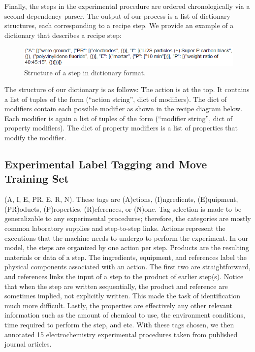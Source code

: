 Finally, the steps in the experimental procedure are ordered chronologically via a second dependency parser. The output of our process is a list of dictionary structures, each corresponding to a recipe step. We provide an example of a dictionary that describes a recipe step:

\begin{figure}
  \centering
    \includegraphics[width=.5\textwidth]{sampleout.png}
  \caption{Structure of a step in dictionary format.}
\end{figure}

The structure of our dictionary is as follows: The action is at the top. It contains a list of tuples of the form (“action string”, dict of modifiers). The dict of modifiers contain each possible modifier as shown in the recipe diagram below. Each modifier is again a list of tuples of the form (“modifier string”, dict of property modifiers). The dict of property modifiers is a list of properties that modify the modifier.

\subsection{Experimental Label Tagging and Move Training Set}
(A, I, E, PR, E, R, N). These tags are (A)ctions, (I)ngredients, (E)quipment, (PR)oducts, (P)roperties, (R)eferences, or (N)one. Tag selection is made to be generalizable to any experimental procedures; therefore, the categories are mostly common laboratory supplies and step-to-step links. Actions represent the executions that the machine needs to undergo to perform the experiment. In our model, the steps are organized by one action per step. Products are the resulting materials or data of a step. The ingredients, equipment, and references label the physical components associated with an action. The first two are straightforward, and references links the input of a step to the product of earlier step(s). Notice that when the step are written sequentially, the product and reference are sometimes implied, not explicitly written. This made the task of identification much more difficult. Lastly, the properties are effectively any other relevant information such as the amount of chemical to use, the environment conditions, time required to perform the step, and etc. With these tags chosen, we then annotated 15 electrochemistry experimental procedures taken from published journal articles. 

